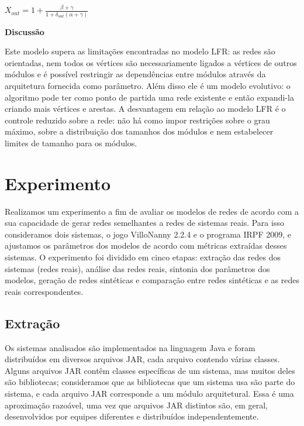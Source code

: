 \documentclass{acm_proc_article-sp}
\begin{document}
$X_{out} = 1 + \frac{\beta + \gamma}{1 + \delta_{out}(\alpha + \gamma)}$

  \textbf{Discussão}

Este modelo supera as limitações encontradas no modelo LFR: as redes são orientadas, nem todos os vértices são necessariamente ligados a vértices de outros módulos e é possível restringir as dependências entre módulos através da arquitetura fornecida como parâmetro. Além disso ele é um modelo evolutivo: o algoritmo pode ter como ponto de partida uma rede existente e então expandi-la criando mais vértices e arestas. A desvantagem em relação ao modelo LFR é o controle reduzido sobre a rede: não há como impor restrições sobre o grau máximo, sobre a distribuição dos tamanhos dos módulos e nem estabelecer limites de tamanho para os módulos.


\section{Experimento} %

Realizamos um experimento a fim de avaliar os modelos de redes de acordo com a sua capacidade de gerar redes semelhantes a redes de sistemas reais. Para isso consideramos dois sistemas, o jogo VilloNanny 2.2.4 e o programa IRPF 2009, e ajustamos os parâmetros dos modelos de acordo com métricas extraídas desses sistemas. O experimento foi dividido em cinco etapas: extração das redes dos sistemas (redes reais), análise das redes reais, sintonia dos parâmetros dos modelos, geração de redes sintéticas e comparação entre redes sintéticas e as redes reais correspondentes. 


\subsection{Extração}

Os sistemas analisados são implementados na linguagem Java e foram distribuídos em diversos arquivos JAR, cada arquivo contendo várias classes. Alguns arquivos JAR contêm classes específicas de um sistema, mas muitos deles são bibliotecas; consideramos que as bibliotecas que um sistema usa são parte do sistema, e cada arquivo JAR corresponde a um módulo arquitetural. Essa é uma aproximação razoável, uma vez que arquivos JAR distintos são, em geral, desenvolvidos por equipes diferentes e distribuídos independentemente. 
\end{document}
